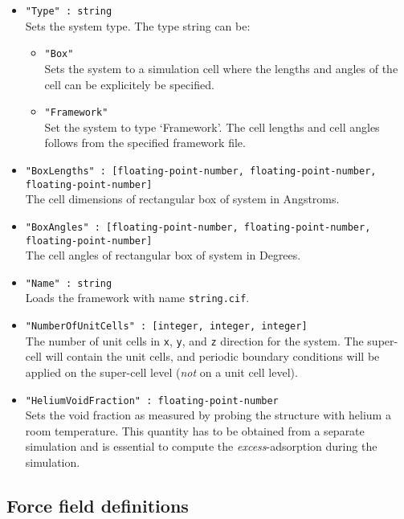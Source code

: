 \begin{itemize}
\item{\verb+"Type" : string+}\\
Sets the system type. The type string can be:
  \begin{itemize}
  \item{\verb+"Box"+}\\
    Sets the system to a simulation cell where the lengths and angles of the cell can be explicitely be specified.
  \item{\verb+"Framework"+}\\
    Set the system to type `Framework'. The cell lengths and cell angles follows from the specified framework file.
  \end{itemize}
\item{\verb+"BoxLengths" : [floating-point-number, floating-point-number, floating-point-number]+}\\
The cell dimensions of rectangular box of system in Angstroms.
\item{\verb+"BoxAngles" : [floating-point-number, floating-point-number, floating-point-number]+}\\
The cell angles of rectangular box of system in Degrees.
\item{\verb+"Name" : string+}\\
Loads the framework with name \verb+string.cif+.
\item{\verb+"NumberOfUnitCells" : [integer, integer, integer]+}\\
The number of unit cells in \verb+x+, \verb+y+, and \verb+z+ direction for the system. 
The super-cell will contain the unit cells, and periodic boundary conditions
will be applied on the super-cell level (\emph{not} on a unit cell level).
\item{\verb+"HeliumVoidFraction" : floating-point-number+}\\
Sets the void fraction as measured by probing the structure with helium a room temperature. 
This quantity has to be obtained from a separate simulation 
and is essential to compute the \emph{excess}-adsorption during the simulation.
\end{itemize}

\subsection{Force field definitions}

